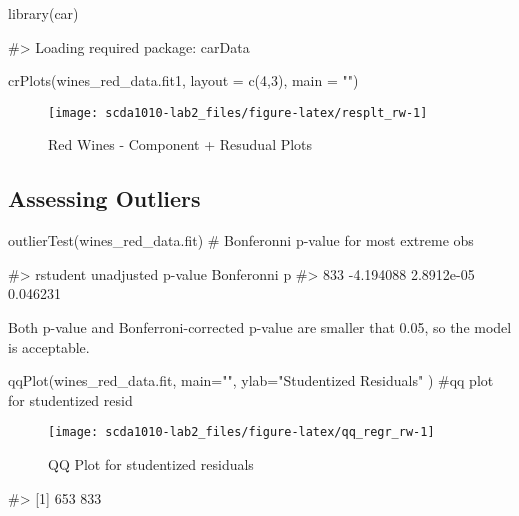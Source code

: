 \begin{Schunk}
\begin{Sinput}
library(car)
\end{Sinput}
\begin{Soutput}
#> Loading required package: carData
\end{Soutput}
\begin{Sinput}
crPlots(wines_red_data.fit1, layout = c(4,3), main = "")
\end{Sinput}
\begin{figure}

{\centering \texttt{[image: scda1010-lab2\_files/figure-latex/resplt\_rw-1]} 

}

\caption[Red Wines - Component + Resudual Plots]{Red Wines - Component + Resudual Plots}\label{fig:resplt_rw}
\end{figure}
\end{Schunk}

\hypertarget{assessing-outliers}{%
\subsection{Assessing Outliers}\label{assessing-outliers}}

\begin{Schunk}
\begin{Sinput}
outlierTest(wines_red_data.fit) # Bonferonni p-value for most extreme obs
\end{Sinput}
\begin{Soutput}
#>      rstudent unadjusted p-value Bonferonni p
#> 833 -4.194088         2.8912e-05     0.046231
\end{Soutput}
\end{Schunk}

Both p-value and Bonferroni-corrected p-value are smaller that 0.05, so
the model is acceptable.

\begin{Schunk}
\begin{Sinput}
qqPlot(wines_red_data.fit, main="", ylab="Studentized Residuals" )  #qq plot for studentized resid 
\end{Sinput}
\begin{figure}[h]

{\centering \texttt{[image: scda1010-lab2\_files/figure-latex/qq\_regr\_rw-1]} 

}

\caption[QQ Plot for studentized residuals]{QQ Plot for studentized residuals}\label{fig:qq_regr_rw}
\end{figure}
\begin{Soutput}
#> [1] 653 833
\end{Soutput}
\end{Schunk}

